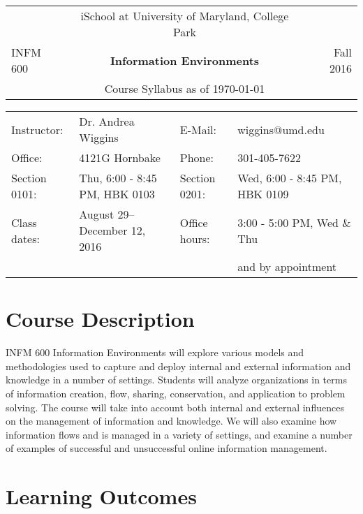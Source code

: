 \documentclass[11pt]{article}
\begin{document}
\begin{center}
  {\large
  \begin{tabulary}{6.5in}{ L C R}
    \setlength{\tymin}{1in}
    & iSchool at University of Maryland, College Park & \\
    INFM 600 \linebreak
& 
    \textbf{Information Environments} &
    Fall 2016 \\
    & Course Syllabus as of \today & \\
  \end{tabulary}
 }
  \vspace{0.5in}
  
  \begin{tabulary}{6.5in}{ p{1in} p{2.1in} p{1.in} p{2.1in}}
    Instructor:& Dr. Andrea Wiggins & E-Mail: & wiggins@umd.edu\\
Office: & 4121G Hornbake & Phone: & 301-405-7622\\
   Section 0101: & Thu, 6:00 - 8:45 PM, HBK 0103 & Section 0201: & Wed, 6:00 - 8:45 PM, HBK 0109\\
    Class dates: & August 29--December 12, 2016 & Office hours: & 3:00 - 5:00 PM, Wed \& Thu \\
    & & & and by appointment\\    
     \end{tabulary}
\end{center}
\vspace{0.25in}
\section{Course Description}
INFM 600 Information Environments will explore various models and methodologies used to capture and deploy internal and external information and knowledge in a number of settings. 
Students will analyze organizations in terms of information creation, flow, sharing, conservation, and application to problem solving. 
The course will take into account both internal and external influences on the management of information and knowledge. 
We will also examine how information flows and is managed in a variety of settings, and examine a number of examples of successful and unsuccessful online information management.


\section{Learning Outcomes}

\end{document}

